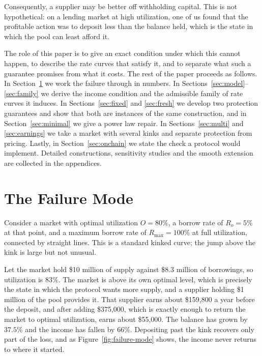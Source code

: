 \documentclass[11pt,a4paper]{article}
\begin{document}
Consequently, a supplier may be better off withholding capital. This is not hypothetical: on a lending market at high utilization, one of us found that the profitable action was to deposit less than the balance held, which is the state in which the pool can least afford it.

The role of this paper is to give an exact condition under which this cannot happen, to describe the rate curves that satisfy it, and to separate what such a guarantee promises from what it costs. The rest of the paper proceeds as follows. In Section~\ref{sec:failure} we work the failure through in numbers. In Sections~\ref{sec:model}--\ref{sec:family} we derive the income condition and the admissible family of rate curves it induces. In Sections~\ref{sec:fixed} and \ref{sec:fresh} we develop two protection guarantees and show that both are instances of the same construction, and in Section~\ref{sec:minimal} we give a power law repair. In Sections~\ref{sec:multi} and \ref{sec:earnings} we take a market with several kinks and separate protection from pricing. Lastly, in Section~\ref{sec:onchain} we state the check a protocol would implement. Detailed constructions, sensitivity studies and the smooth extension are collected in the appendices.

\section{The Failure Mode}
\label{sec:failure}

Consider a market with optimal utilization $O=80\%$, a borrow rate of $R_o=5\%$ at that point, and a maximum borrow rate of $R_{\max}=100\%$ at full utilization, connected by straight lines. This is a standard kinked curve; the jump above the kink is large but not unusual.

Let the market hold \$10 million of supply against \$8.3 million of borrowings, so utilization is $83\%$. The market is above its own optimal level, which is precisely the state in which the protocol wants more supply, and a supplier holding \$1 million of the pool provides it. That supplier earns about \$159{,}800 a year before the deposit, and after adding \$375{,}000, which is exactly enough to return the market to optimal utilization, earns about \$55{,}000. The balance has grown by $37.5\%$ and the income has fallen by $66\%$. Depositing past the kink recovers only part of the loss, and as Figure~\ref{fig:failure-mode} shows, the income never returns to where it started.
\end{document}
